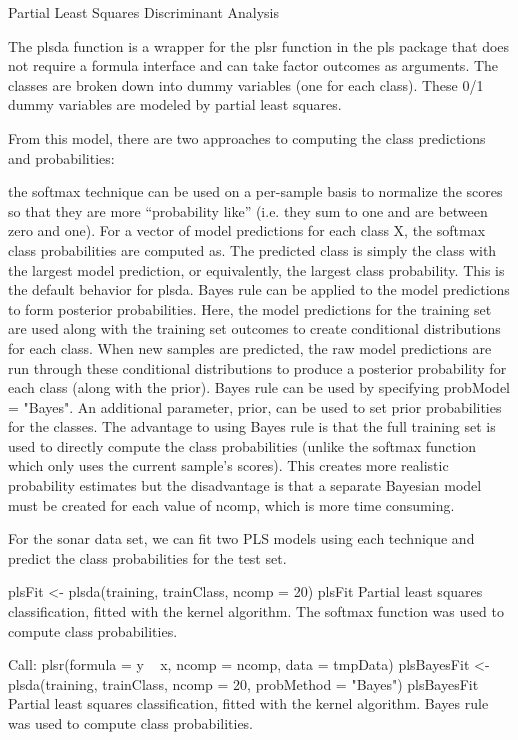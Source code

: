Partial Least Squares Discriminant Analysis

The plsda function is a wrapper for the plsr function in the pls package that does not require a formula interface and can take factor outcomes as arguments. The classes are broken down into dummy variables (one for each class). These 0/1 dummy variables are modeled by partial least squares.

From this model, there are two approaches to computing the class predictions and probabilities:

the softmax technique can be used on a per-sample basis to normalize the scores so that they are more ``probability like'' (i.e. they sum to one and are between zero and one). For a vector of model predictions for each class X, the softmax class probabilities are computed as. The predicted class is simply the class with the largest model prediction, or equivalently, the largest class probability. This is the default behavior for plsda.
Bayes rule can be applied to the model predictions to form posterior probabilities. Here, the model predictions for the training set are used along with the training set outcomes to create conditional distributions for each class. When new samples are predicted, the raw model predictions are run through these conditional distributions to produce a posterior probability for each class (along with the prior). Bayes rule can be used by specifying probModel = "Bayes". An additional parameter, prior, can be used to set prior probabilities for the classes.
The advantage to using Bayes rule is that the full training set is used to directly compute the class probabilities (unlike the softmax function which only uses the current sample's scores). 
This creates more realistic probability estimates but the disadvantage is that a separate Bayesian model must be created for each value of ncomp, which is more time consuming.

For the sonar data set, we can fit two PLS models using each technique and predict the class probabilities 
for the test set.

plsFit <- plsda(training, trainClass, ncomp = 20)
plsFit
Partial least squares classification, fitted with the kernel algorithm.
The softmax function was used to compute class probabilities.

Call:
plsr(formula = y ~ x, ncomp = ncomp, data = tmpData)
plsBayesFit <- plsda(training, trainClass, ncomp = 20,
                     probMethod = "Bayes")
plsBayesFit
Partial least squares classification, fitted with the kernel algorithm.
Bayes rule was used to compute class probabilities.

